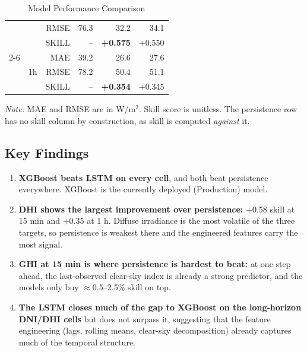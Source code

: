 \documentclass[11pt,a4paper]{article}
\begin{document}
\begin{table}[H]
\begin{tabular}{@{}llrrrr@{}}
                     &                        & RMSE  & 76.3  & 32.2  & 34.1 \\
                     &                        & SKILL &  --      & \textbf{+0.575} & +0.550 \\
\cmidrule{2-6}
\multirow{3}{*}{DHI} & \multirow{3}{*}{1h}   & MAE   & 39.2  & 26.6  & 27.6 \\
                     &                        & RMSE  & 78.2  & 50.4  & 51.1 \\
                     &                        & SKILL &  --      & \textbf{+0.354} & +0.345 \\
\bottomrule
\end{tabular}
\caption{Model Performance Comparison}
\label{tab:results}
\end{table}

\noindent\textit{Note:} MAE and RMSE are in W/m$^2$. Skill score is unitless. The persistence row has no skill column by construction, as skill is computed \emph{against} it.

\subsection{Key Findings}

\begin{enumerate}[leftmargin=*]
    \item \textbf{XGBoost beats LSTM on every cell}, and both beat persistence everywhere. XGBoost is the currently deployed (Production) model.
    
    \item \textbf{DHI shows the largest improvement over persistence:} +0.58 skill at 15 min and +0.35 at 1 h. Diffuse irradiance is the most volatile of the three targets, so persistence is weakest there and the engineered features carry the most signal.
    
    \item \textbf{GHI at 15 min is where persistence is hardest to beat:} at one step ahead, the last-observed clear-sky index is already a strong predictor, and the models only buy $\approx$0.5--2.5\% skill on top.
    
    \item \textbf{The LSTM closes much of the gap to XGBoost on the long-horizon DNI/DHI cells} but does not surpass it, suggesting that the feature engineering (lags, rolling means, clear-sky decomposition) already captures much of the temporal structure.
\end{enumerate}
\end{document}
